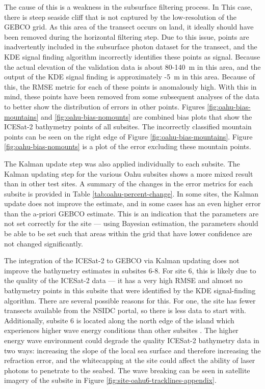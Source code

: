 The cause of this is a weakness in the subsurface filtering process. In This case, there is steep seaside cliff that is not captured by the low-resolution of the GEBCO grid. As this area of the transect occurs on land, it ideally should have been removed during the horizontal filtering step. Due to this issue, points are inadvertently included in the subsurface photon dataset for the transect, and the KDE signal finding algorithm incorrectly identifies these points as signal. Because the actual elevation of the validation data is about 80-140~m in this area, and the output of the KDE signal finding is approximately -5~m in this area. Because of this, the RMSE metric for each of these points is anomalously high. With this in mind, these points have been removed from some subsequent analyses of the data to better show the distribution of errors in other points. Figures \ref{fig:oahu-bias-mountains} and \ref{fig:oahu-bias-nomounts} are combined bias plots that show the ICESat-2 bathymetry points of all subsites. The incorrectly classified mountain points can be seen on the right edge of Figure \ref{fig:oahu-bias-mountains}. Figure \ref{fig:oahu-bias-nomounts} is a plot of the error excluding these mountain points.

The Kalman update step was also applied individually to each subsite. The Kalman updating step for the various Oahu subsites shows a more mixed result than in other test sites. A summary of the changes in the error metrics for each subsite is provided in Table \ref{tab:oahu-percent-change}. In some sites, the Kalman update does not improve the estimate, and in some cases has an even higher error than the a-priori GEBCO estimate. This is an indication that the parameters are not set correctly for the site --- using Bayesian estimation, the parameters should be able to be set such that areas within the grid that have lower confidence are not changed significantly.

The integration of the ICESat-2 to GEBCO via Kalman updating does not improve the bathymetry estimates in subsites 6-8. For site 6, this is likely due to the quality of the ICESat-2 data --- it has a very high RMSE and almost no bathymetry points in this subsite that were identified by the KDE signal-finding algorithm. There are several possible reasons for this. For one, the site has fewer transects available from the NSIDC portal, so there is less data to start with. Additionally, subsite 6 is located along the north edge of the island which experiences higher wave energy conditions than other subsites \parencite{Vitousek2008a}. The higher energy wave environment could degrade the quality ICESat-2 bathymetry data in two ways: increasing the slope of the local sea surface and therefore increasing the refraction error, and the whitecapping at the site could affect the ability of laser photons to penetrate to the seabed. The  wave breaking can be seen in satellite imagery of the subsite in Figure \ref{fig:site-oahu6-tracklines-appendix}.

